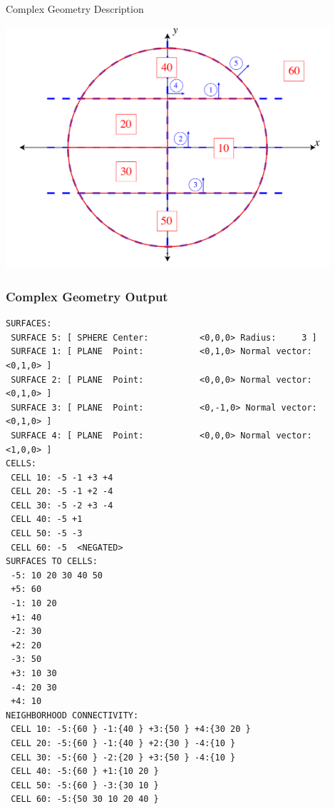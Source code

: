 \documentclass{beamer}
\begin{document}
\begin{frame}{Complex Geometry Description}
  \begin{center}
    \includegraphics[width=0.9\textwidth, keepaspectratio]{test_geom_1}
  \end{center}
\end{frame}

\begin{frame}[fragile]
\frametitle{Complex Geometry Output}
%

\begin{Verbatim}
SURFACES: 
 SURFACE 5: [ SPHERE Center:          <0,0,0> Radius:     3 ]
 SURFACE 1: [ PLANE  Point:           <0,1,0> Normal vector:          <0,1,0> ]
 SURFACE 2: [ PLANE  Point:           <0,0,0> Normal vector:          <0,1,0> ]
 SURFACE 3: [ PLANE  Point:           <0,-1,0> Normal vector:          <0,1,0> ]
 SURFACE 4: [ PLANE  Point:           <0,0,0> Normal vector:          <1,0,0> ]
CELLS: 
 CELL 10: -5 -1 +3 +4 
 CELL 20: -5 -1 +2 -4 
 CELL 30: -5 -2 +3 -4 
 CELL 40: -5 +1 
 CELL 50: -5 -3 
 CELL 60: -5  <NEGATED>
SURFACES TO CELLS: 
 -5: 10 20 30 40 50 
 +5: 60 
 -1: 10 20 
 +1: 40 
 -2: 30 
 +2: 20 
 -3: 50 
 +3: 10 30 
 -4: 20 30 
 +4: 10 
NEIGHBORHOOD CONNECTIVITY: 
 CELL 10: -5:{60 } -1:{40 } +3:{50 } +4:{30 20 } 
 CELL 20: -5:{60 } -1:{40 } +2:{30 } -4:{10 } 
 CELL 30: -5:{60 } -2:{20 } +3:{50 } -4:{10 } 
 CELL 40: -5:{60 } +1:{10 20 } 
 CELL 50: -5:{60 } -3:{30 10 } 
 CELL 60: -5:{50 30 10 20 40 } 
\end{Verbatim}
\end{frame}  

\end{document}
